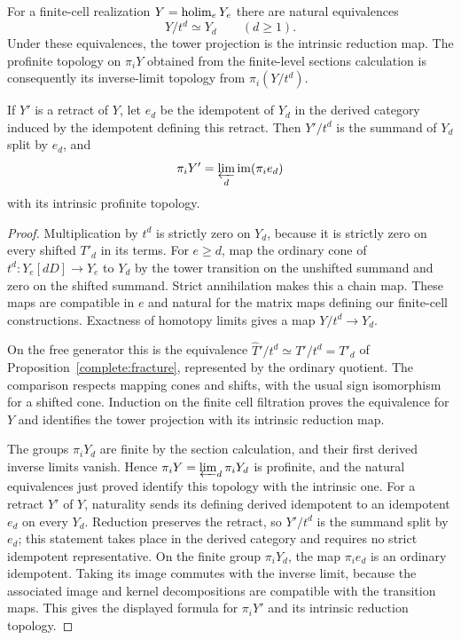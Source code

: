 \begin{lemma}
\label{complete:reductions}
For a finite-cell realization $Y=\operatorname{holim}_eY_e$ there are natural
equivalences
\[
 Y/t^d\simeq Y_d\qquad(d\geq1).
\]
Under these equivalences, the tower projection is the intrinsic
reduction map. The profinite topology on $\pi_iY$ obtained from the
finite-level sections calculation is consequently its inverse-limit
topology from $\pi_i(Y/t^d)$.

If $Y'$ is a retract of $Y$, let $e_d$ be the idempotent of $Y_d$ in
the derived category induced by the idempotent defining this retract.
Then $Y'/t^d$ is the summand of $Y_d$ split by $e_d$, and
\[
 \pi_iY'=\varprojlim_d\operatorname{im}(\pi_i e_d)
\]
with its intrinsic profinite topology.
\end{lemma}

\begin{proof}
Multiplication by $t^d$ is strictly zero on $Y_d$, because it is
strictly zero on every shifted $T'_d$ in its terms. For $e\geq d$,
map the ordinary cone of $t^d:Y_e[dD]\to Y_e$ to $Y_d$ by the
tower transition on the unshifted summand and zero on the shifted
summand. Strict annihilation makes this a chain map. These maps
are compatible in $e$ and natural for the matrix maps defining our
finite-cell constructions. Exactness of homotopy limits gives a
map $Y/t^d\to Y_d$.

On the free generator this is the equivalence
$\widehat T'/t^d\simeq T'/t^d=T'_d$ of
Proposition~\ref{complete:fracture}, represented by the ordinary
quotient. The comparison respects mapping cones and shifts, with the
usual sign isomorphism for a shifted cone. Induction on the finite cell
filtration proves the equivalence for $Y$ and identifies the tower
projection with its intrinsic reduction map.

The groups $\pi_iY_d$ are finite by the section calculation, and their
first derived inverse limits vanish. Hence
$\pi_iY=\varprojlim_d\pi_iY_d$ is profinite, and the natural
equivalences just proved identify this topology with the intrinsic
one. For a retract $Y'$ of $Y$, naturality sends its defining derived
idempotent to an idempotent $e_d$ on every $Y_d$. Reduction preserves
the retract, so $Y'/t^d$ is the summand split by $e_d$; this statement
takes place in the derived category and requires no strict idempotent
representative. On the finite group $\pi_iY_d$, the map $\pi_i e_d$
is an ordinary idempotent. Taking its image commutes with the inverse
limit, because the associated image and kernel decompositions are
compatible with the transition maps. This gives the displayed formula
for $\pi_iY'$ and its intrinsic reduction topology.
\end{proof}

